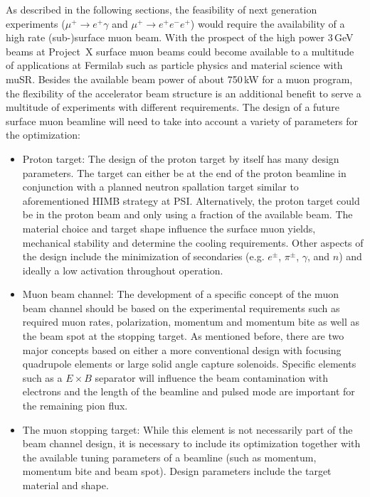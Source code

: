 As described in the following sections, the feasibility of next generation experiments ($\mu^+ \to e^+\gamma$ and $\mu^+ \to e^+e^-e^+$) would require the availability of a high rate (sub-)surface muon beam. With the prospect of the high power 3\,GeV beams at Project~X surface muon beams could become available to a multitude of applications at Fermilab such as particle physics and material science with muSR. Besides the available beam power of about 750\,kW for a muon program, the flexibility of the accelerator beam structure is an additional benefit to serve a multitude of experiments with different requirements. The design of a future surface muon beamline will need to take into account a variety of parameters for the optimization:
\begin{itemize}
\item Proton target: The design of the proton target by itself has many design parameters. The target can either be at the end of the proton beamline in conjunction with a planned neutron spallation target similar to aforementioned HIMB strategy at PSI. Alternatively, the proton target could be in the proton beam and only using a fraction of the available beam. The material choice and target shape influence the surface muon yields, mechanical stability and determine the cooling requirements. Other aspects of the design include the minimization of secondaries (e.g. $e^\pm$, $\pi^\pm$, $\gamma$, and $n$) and ideally a low activation throughout operation. 
\item Muon beam channel: The development of a specific concept of the muon beam channel should be based on the experimental requirements such as required muon rates, polarization, momentum and momentum bite as well as the beam spot at the stopping target. As mentioned before, there are two major concepts based on either a more conventional design with focusing quadrupole elements or large solid angle capture solenoids. Specific elements such as a $E\times B$ separator will influence the beam contamination with electrons and the length of the beamline and pulsed mode are important for the remaining pion flux.
\item The muon stopping target: While this element is not necessarily part of the beam channel design, it is necessary to include its optimization together with the available tuning parameters of a beamline (such as momentum, momentum bite and beam spot). Design parameters include the target material and shape. 
\end{itemize}

